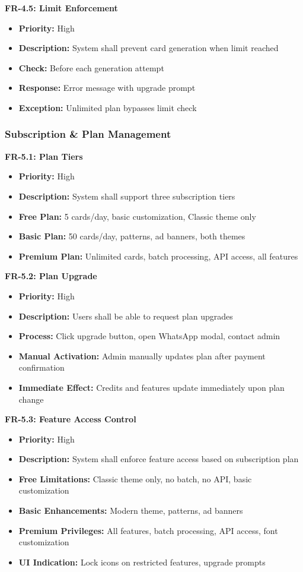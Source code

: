 \documentclass[12pt,a4paper]{article}
\begin{document}
\textbf{FR-4.5: Limit Enforcement}
\begin{itemize}
    \item \textbf{Priority:} High
    \item \textbf{Description:} System shall prevent card generation when limit reached
    \item \textbf{Check:} Before each generation attempt
    \item \textbf{Response:} Error message with upgrade prompt
    \item \textbf{Exception:} Unlimited plan bypasses limit check
\end{itemize}

\subsubsection{Subscription \& Plan Management}

\textbf{FR-5.1: Plan Tiers}
\begin{itemize}
    \item \textbf{Priority:} High
    \item \textbf{Description:} System shall support three subscription tiers
    \item \textbf{Free Plan:} 5 cards/day, basic customization, Classic theme only
    \item \textbf{Basic Plan:} 50 cards/day, patterns, ad banners, both themes
    \item \textbf{Premium Plan:} Unlimited cards, batch processing, API access, all features
\end{itemize}

\textbf{FR-5.2: Plan Upgrade}
\begin{itemize}
    \item \textbf{Priority:} High
    \item \textbf{Description:} Users shall be able to request plan upgrades
    \item \textbf{Process:} Click upgrade button, open WhatsApp modal, contact admin
    \item \textbf{Manual Activation:} Admin manually updates plan after payment confirmation
    \item \textbf{Immediate Effect:} Credits and features update immediately upon plan change
\end{itemize}

\textbf{FR-5.3: Feature Access Control}
\begin{itemize}
    \item \textbf{Priority:} High
    \item \textbf{Description:} System shall enforce feature access based on subscription plan
    \item \textbf{Free Limitations:} Classic theme only, no batch, no API, basic customization
    \item \textbf{Basic Enhancements:} Modern theme, patterns, ad banners
    \item \textbf{Premium Privileges:} All features, batch processing, API access, font customization
    \item \textbf{UI Indication:} Lock icons on restricted features, upgrade prompts
\end{itemize}
\end{document}
